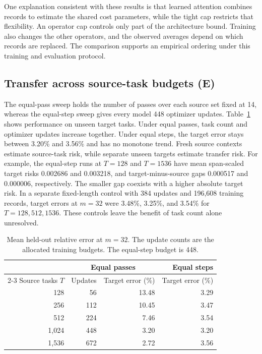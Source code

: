 \documentclass[11pt,letterpaper]{article}
\newcommand{\pct}[1]{#1\%}
\begin{document}
One explanation consistent with these results is that learned attention
combines records to estimate the shared cost parameters, while the
tight cap restricts that flexibility. An operator cap controls only
part of the architecture bound. Training also changes the other
operators, and the observed averages depend on which records are
replaced. The comparison supports an empirical ordering under this
training and evaluation protocol.

\clearpage
\subsection{Transfer across source-task budgets (E)}
The equal-pass sweep holds the number of passes over each source set
fixed at 14, whereas the equal-step sweep gives every model 448
optimizer updates. Table~\ref{tab:e} shows performance on unseen
target tasks. Under equal passes, task count and optimizer updates
increase together. Under equal steps, the target error stays between
\pct{3.20} and \pct{3.56} and has no monotone trend. Fresh source
contexts estimate source-task risk, while separate unseen targets
estimate transfer risk. For example, the equal-step runs at
\(T=128\) and \(T=1536\) have mean span-scaled target risks
0.002686 and 0.003218, and target-minus-source gaps 0.000517 and
0.000006, respectively. The smaller gap coexists with a higher
absolute target risk. In a separate fixed-length control with
384 updates and 196,608 training records, target errors at \(m=32\)
were \pct{3.48}, \pct{3.25}, and \pct{3.54} for \(T=128,512,1536\).
These controls leave the benefit of task count alone unresolved.

\begin{table}[ht]
\centering
\small
\begin{tabular}{r rr r}
\toprule
&\multicolumn{2}{c}{Equal passes}&Equal steps\\
\cmidrule(lr){2-3}
Source tasks \(T\)&Updates&Target error (\%)&Target error (\%)\\
\midrule
128   &56  &13.48&3.29\\
256   &112 &10.45&3.47\\
512   &224 &7.46&3.54\\
1,024 &448 &3.20&3.20\\
1,536 &672 &2.72&3.56\\
\bottomrule
\end{tabular}
\caption{Mean held-out relative error at \(m=32\). The update counts
are the allocated training budgets. The equal-step budget is 448.}
\label{tab:e}
\end{table}
\end{document}
